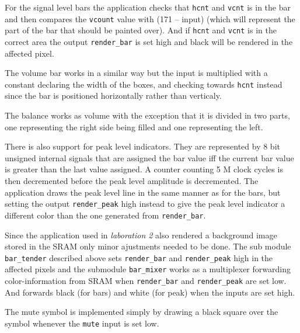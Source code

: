 For the signal level bars the application checks that \verb+hcnt+ and
\verb+vcnt+ is in the bar and then compares the \verb+vcount+ value with
(171 -- input)
(which will represent the part of the bar that should be
painted over). And if \verb+hcnt+ and \verb+vcnt+ is in the correct
area the output \verb+render_bar+ is set high and black will be rendered in
the affected pixel.

The volume bar works in a similar way but the input is multiplied with
a constant declaring the width of the boxes, and checking towards
\verb+hcnt+ instead since the bar is positioned horizontally rather
than verticaly.

The balance works as volume with the exception that it is divided in two
parts, one representing the right side being filled and one
representing the left.

There is also support for peak level indicators. They are represented
by 8 bit unsigned internal signals that are assigned the bar value iff
the current bar value is greater than the last value assigned. A
counter counting 5 M clock cycles is then decremented before the peak
level amplitude is decremented. The application draws the peak level
line in the same manner as for the bars, but setting the output
\verb+render_peak+ high instead to give the peak level indicator a
different color than the one generated from \verb+render_bar+.

Since the application used in \emph{laboration 2} also rendered a background image
stored in the SRAM only minor ajustments needed to be done. The
sub module \verb+bar_tender+ described above sets \verb+render_bar+ and
\verb+render_peak+ high in the affected pixels and the submodule
\verb+bar_mixer+ works as a multiplexer forwarding color-information
from SRAM when \verb+render_bar+ and \verb+render_peak+ are set
low. And forwards black (for bars) and white (for peak) when the
inputs are set high.

The mute symbol is implemented simply by drawing a black square over
the symbol whenever the \verb+mute+ input is set low.
 
